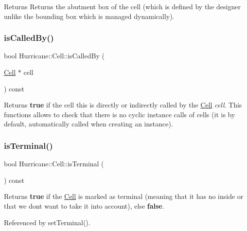 Returns Returns the abutment box of the cell (which is defined by the designer unlike the bounding box which is managed dynamically). \mbox{\label{classHurricane_1_1Cell_a239354e1b4ad9b751abf5a064e43b0e6}} 
\subsubsection{\texorpdfstring{is\+Called\+By()}{isCalledBy()}}
{\footnotesize\ttfamily bool Hurricane\+::\+Cell\+::is\+Called\+By (\begin{DoxyParamCaption}\item[{\mbox{\hyperlink{classHurricane_1_1Cell}{Cell}} $\ast$}]{cell }\end{DoxyParamCaption}) const}

Returns {\bfseries true} if the cell {\ttfamily this} is directly or indirectly called by the \mbox{\hyperlink{classHurricane_1_1Cell}{Cell}} {\itshape cell}. This functions allows to check that there is no cyclic instance calls of cells (it is by default, automatically called when creating an instance). \mbox{\label{classHurricane_1_1Cell_aac4e9218b7806f3a0f2d5a55f00abd69}} 
\subsubsection{\texorpdfstring{is\+Terminal()}{isTerminal()}}
{\footnotesize\ttfamily bool Hurricane\+::\+Cell\+::is\+Terminal (\begin{DoxyParamCaption}{ }\end{DoxyParamCaption}) const\hspace{0.3cm}{\ttfamily [inline]}}

Returns {\bfseries true} if the \mbox{\hyperlink{classHurricane_1_1Cell}{Cell}} is marked as terminal (meaning that it has no inside or that we dont want to take it into account), else {\bfseries false}. 

Referenced by set\+Terminal().

\mbox{\label{classHurricane_1_1Cell_a6c2f2fd9f6f6e0578937a90c0c37a507}} 
